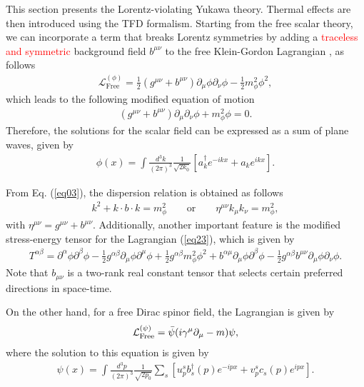 \documentclass[11pt,showpacs,preprintnumbers,amsmath,amssymb,prd,nofootinbib,superscriptaddress]{revtex4-2}
\begin{document}
This section presents the Lorentz-violating Yukawa theory. Thermal effects are then introduced using the TFD formalism. Starting from the free scalar theory, we can incorporate a term that breaks Lorentz symmetries by adding a \textcolor{red}{traceless and symmetric} background field $b^{\mu\nu}$ to the free Klein-Gordon Lagrangian \textcolor{red}{\cite{kostelecky2,altschul}}, as follows
\begin{eqnarray}
    \mathcal{L}_{\text{Free}}^{(\phi)}=\frac{1}{2}\left(g^{\mu\nu}+b^{\mu\nu}\right)\partial_\mu\phi\partial_\nu\phi-\frac{1}{2}m_{\phi}^2\phi^2,\label{eq23}
\end{eqnarray}
which leads to the following modified equation of motion
\begin{eqnarray}
    \left(g^{\mu\nu}+b^{\mu\nu}\right)\partial_\mu\partial_\nu\phi+m_\phi^2\phi=0.\label{eq03}
\end{eqnarray}
Therefore, the solutions for the scalar field can be expressed as a sum of plane waves, given by
\begin{eqnarray}
    \phi(x)=\int\frac{d^3k}{(2\pi)^3}\frac{1}{\sqrt{2k_0}}\left[a_k^{\dagger}e^{-ikx}+a_k e^{ikx}\right].\label{eq04}
    \end{eqnarray}
    
From Eq. (\ref{eq03}), the dispersion relation is obtained as follows
\begin{eqnarray}
    k^2+k\cdot b\cdot k=m_\phi^2\quad\quad \text{or}\quad\quad \eta^{\mu\nu}k_{\mu}k_{\nu}=m_{\phi}^2,
\end{eqnarray}
with $\eta^{\mu\nu}=g^{\mu\nu}+b^{\mu\nu}$. Additionally, another important feature is the modified stress-energy tensor for the Lagrangian (\ref{eq23}), which is given by
\begin{eqnarray}
    T^{\alpha\beta}=\partial^\alpha\phi\partial^\beta\phi-\frac{1}{2}g^{\alpha\beta}\partial_\mu\phi\partial^\mu\phi+\frac{1}{2}g^{\alpha\beta}m_\phi^2\phi^2 +b^{\alpha\mu}\partial_\mu\phi\partial^\beta\phi-\frac{1}{2}g^{\alpha\beta}b^{\mu\nu}\partial_\mu\phi\partial_\nu\phi.\label{eq26}
\end{eqnarray}
Note that $b_{\mu\nu}$ is a two-rank real constant tensor that selects certain preferred directions in space-time.

On the other hand, for a free Dirac spinor field, the Lagrangian is given by
\begin{eqnarray}
    \mathcal{L}_{\text{Free}}^{(\psi)}=\Bar{\psi}(i\gamma^\mu\partial_\mu-m)\psi,
\end{eqnarray}
where the solution to this equation is given by
\begin{eqnarray}
    \psi (x) = \int \frac{d^3 p}{(2 \pi)^3}\frac{1}{\sqrt{2p_0}}  \sum_{s}\left[ u^s_p b^\dagger_s(p) e^{-ipx} + v^s_p c_s(p) e^{ipx}\right].\label{eq25}
\end{eqnarray}
\end{document}
